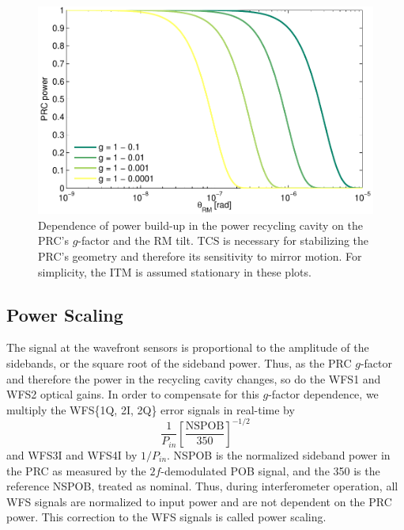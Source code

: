 \begin{figure}
\begin{centering}
\includegraphics[width=1.0\columnwidth]{figures/prc_power.pdf}
\caption[Theoretical dependence of power recycling cavity power on
$g$-factor and mirror angle]{Dependence of power build-up in the power
  recycling cavity on the PRC's $g$-factor and the RM tilt. TCS is
  necessary for stabilizing the PRC's geometry and therefore its
  sensitivity to mirror motion. For simplicity, the ITM is assumed
  stationary in these plots.}
\label{fig:prc_power}
\end{centering}
\end{figure}


\subsection{Power Scaling}
The signal at the wavefront sensors is proportional to the amplitude
of the sidebands, or the square root of the sideband power. Thus, as
the PRC $g$-factor and therefore the power in the recycling cavity
changes, so do the WFS1 and WFS2 optical gains. In order to
compensate for this $g$-factor dependence, we multiply the WFS\{1Q,
2I, 2Q\} error signals in real-time by
\begin{equation}
\frac{1}{P_{in}} \left[\frac{\mathrm{NSPOB}}{350}\right]^{-1/2}
\end{equation}
and WFS3I and WFS4I by $1/P_{in}$. NSPOB is the normalized sideband
power in the PRC as measured by the $2f$-demodulated POB signal, and
the 350 is the reference NSPOB, treated as nominal. Thus, during
interferometer operation, all WFS signals are normalized to input
power and are not dependent on the PRC power. This correction to the
WFS signals is called power scaling.


